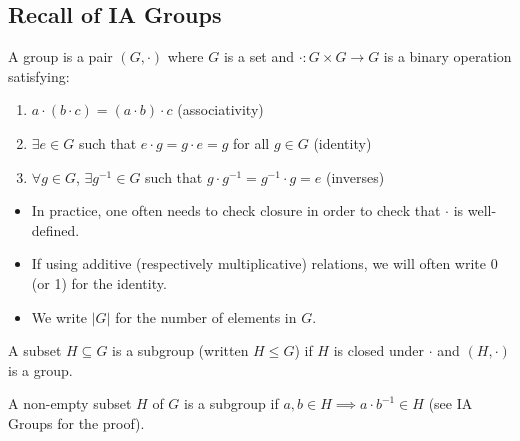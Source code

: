 \documentclass[a4paper]{scrartcl}
\begin{document}
\subsection{Recall of IA Groups}
\begin{definition}[Group]
     A group is a pair $(G, \cdot)$ where $G$ is a set and $\cdot: G \times G \rightarrow  G$ is a binary operation satisfying:
     \begin{enumerate}
         \item $a \cdot (b \cdot c)=(a \cdot b)\cdot c$ (associativity)
         \item $\exists e \in G$ such that $e \cdot g= g \cdot e =g$ for all $g \in G$ (identity)
         \item $\forall g \in G$, $\exists {g}^{-1} \in G$ such that $g \cdot {g}^{-1}={g}^{-1}\cdot g=e$ (inverses)
     \end{enumerate}
\end{definition}
\begin{remark}
     \begin{itemize}
         \item In practice, one often needs to check closure in order to check that $\cdot $ is well-defined.
         \item If using additive (respectively multiplicative) relations, we will often write 0 (or 1) for the identity.
         \item We write $|G|$ for the number of elements in $G$.
     \end{itemize}
\end{remark}
\begin{definition}[Subgroup]
     A subset $H \subseteq G$ is a subgroup (written $H \leq G$) if $H$ is closed under $\cdot$ and $(H, \cdot)$ is a group.
\end{definition}
\begin{remark}
     A non-empty subset $H$ of $G$ is a subgroup if $a,b \in H \implies a \cdot {b}^{-1} \in H$ (see IA Groups for the proof). 
\end{remark}
\end{document}
